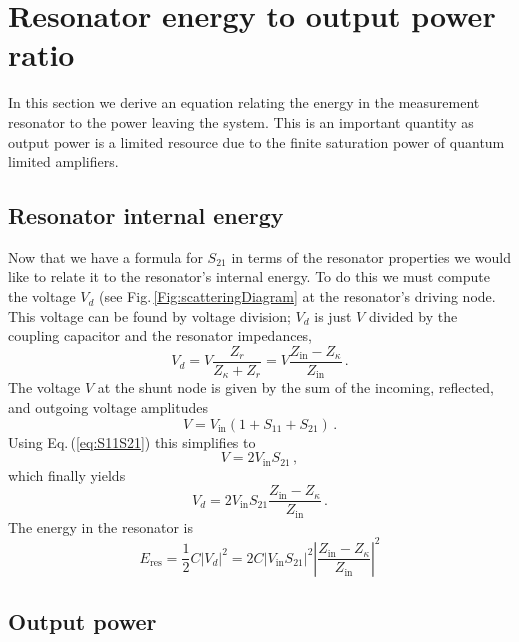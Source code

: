 \section{Resonator energy to output power ratio}

In this section we derive an equation relating the energy in the measurement resonator to the power leaving the system. This is an important quantity as output power is a limited resource due to the finite saturation power of quantum limited amplifiers.

\subsection{Resonator internal energy}

Now that we have a formula for $S_{21}$ in terms of the resonator properties we would like to relate it to the resonator's internal energy. To do this we must compute the voltage $V_d$ (see Fig.\,\ref{Fig:scatteringDiagram} at the resonator's driving node. This voltage can be found by voltage division; $V_d$ is just $V$ divided by the coupling capacitor and the resonator impedances, \begin{equation}
V_d = V \frac{Z_r}{Z_{\kappa} + Z_r} = V \frac{Z_{\text{in}}-Z_{\kappa}}{Z_{\text{in}}} \, . \end{equation}
The voltage $V$ at the shunt node is given by the sum of the incoming, reflected, and outgoing voltage amplitudes \begin{equation}
V = V_{\text{in}} \left( 1 + S_{11} + S_{21} \right) \, . \label{eq:VinS} \end{equation}
Using Eq.\,(\ref{eq:S11S21})  this simplifies to \begin{equation}
V = 2 V_{\text{in}} S_{21} \, , \end{equation}
which finally yields \begin{equation}
V_d = 2V_{\text{in}}S_{21} \frac{Z_{\text{in}} - Z_{\kappa}}{Z_{\text{in}}} \, . \end{equation}
The energy in the resonator is \begin{equation}
E_{\text{res}}=\frac{1}{2}C|V_d|^2 = 2C \left| V_{\text{in}} S_{21} \right|^2 \left| \frac{Z_{\text{in}} - Z_{\kappa}}{Z_{\text{in}}} \right|^2 \end{equation}

\subsection{Output power}

